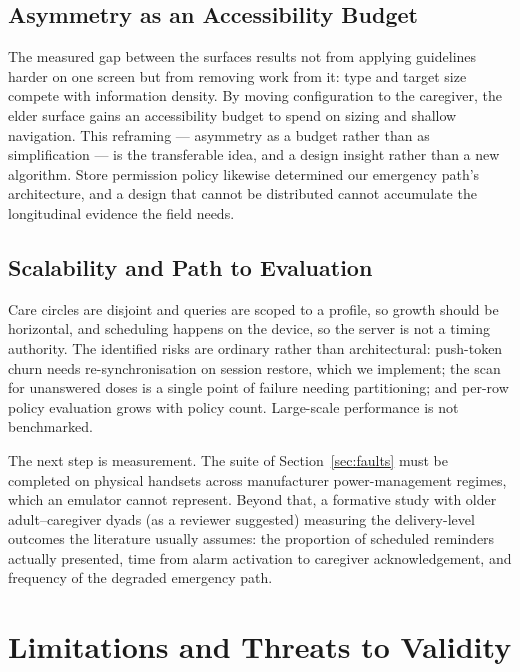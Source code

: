 \documentclass[runningheads,a4paper]{llncs}
\begin{document}
\subsection{Asymmetry as an Accessibility Budget}
The measured gap between the surfaces results not from applying guidelines harder on one
screen but from removing work from it: type and target size compete with information
density. By moving configuration to the caregiver, the elder surface gains an accessibility
budget to spend on sizing and shallow navigation. This reframing --- asymmetry as a budget
rather than as simplification --- is the transferable idea, and a design insight rather than
a new algorithm. Store permission policy likewise determined our emergency path's
architecture, and a design that cannot be distributed cannot accumulate the longitudinal
evidence the field needs.

\subsection{Scalability and Path to Evaluation}

Care circles are disjoint and queries are scoped to a profile, so growth should be
horizontal, and scheduling happens on the device, so the server is not a timing authority.
The identified risks are ordinary rather than architectural: push-token churn needs
re-synchronisation on session restore, which we implement; the scan for unanswered doses is
a single point of failure needing partitioning; and per-row policy evaluation grows with
policy count. Large-scale performance is not benchmarked.

The next step is measurement. The suite of Section~\ref{sec:faults} must be completed on
physical handsets across manufacturer power-management regimes, which an emulator cannot
represent. Beyond that, a formative study with older adult--caregiver dyads (as a reviewer
suggested) measuring the delivery-level outcomes the literature usually assumes: the
proportion of scheduled reminders actually presented, time from alarm activation to
caregiver acknowledgement, and frequency of the degraded emergency path.

\section{Limitations and Threats to Validity}
\label{sec:limits}
\label{sec:threats}
\end{document}
